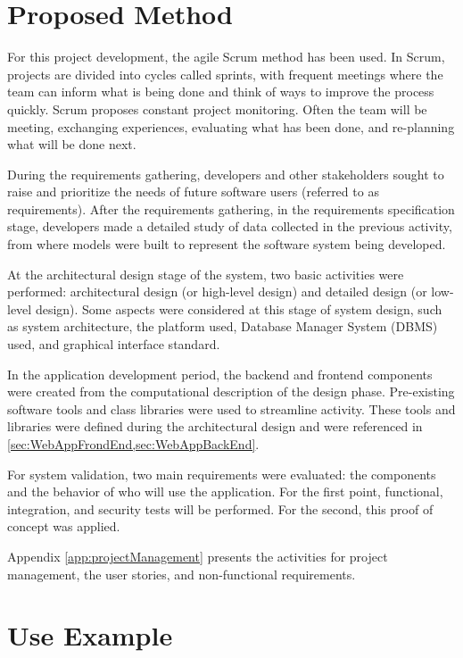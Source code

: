 \label{chap:useExample}

\acresetall 

\section{Proposed Method}\label{sec:method}

For this project development, the agile Scrum method has been used. In Scrum, projects are divided into cycles called sprints, with frequent meetings where the team can inform what is being done and think of ways to improve the process quickly. Scrum proposes constant project monitoring. Often the team will be meeting, exchanging experiences, evaluating what has been done, and re-planning what will be done next.

During the requirements gathering, developers and other stakeholders sought to raise and prioritize the needs of future software users (referred to as requirements). After the requirements gathering, in the requirements specification stage, developers made a detailed study of data collected in the previous activity, from where models were built to represent the software system being developed.

At the architectural design stage of the system, two basic activities were performed: architectural design (or high-level design) and detailed design (or low-level design). Some aspects were considered at this stage of system design, such as system architecture, the platform used, Database Manager System (DBMS) used, and graphical interface standard.

In the application development period, the backend and frontend components were created from the computational description of the design phase. Pre-existing software tools and class libraries were used to streamline activity. These tools and libraries were defined during the architectural design and were referenced in \cref{sec:WebAppFrondEnd,sec:WebAppBackEnd}.

For system validation, two main requirements were evaluated: the components and the behavior of who will use the application. For the first point, functional, integration, and security tests will be performed. For the second, this proof of concept was applied.

Appendix \ref{app:projectManagement} presents the activities for project management, the user stories, and non-functional requirements. 


\section{Use Example}\label{sec:workflow}


